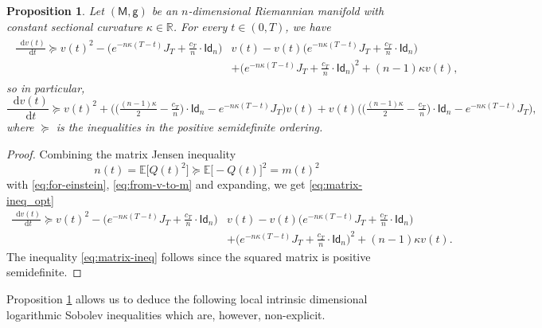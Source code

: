\documentclass[a4paper,twoside,11pt,reqno]{amsart}
\newtheorem{proposition}[theorem]{Proposition}
\newcommand*\diff{\mathop{}\!\mathrm{d}}
\newcommand{\R}{\mathbb{R}} %
\newcommand{\MM}{\mathsf{M}}
\newcommand{\GG}{\mathsf{g}}
\newcommand{\mb}{\mathbb}
\newcommand{\msf}{\mathsf}
\begin{document}
\begin{proposition} \label{prop:matrix-ineq}
Let $(\MM,\GG)$ be an $n$-dimensional Riemannian manifold with constant sectional curvature $\kappa \in\R$. For every $t\in(0,T)$, we have
\begin{align}
\label{eq:matrix-ineq_opt}
\begin{split}
\frac{\diff v(t)}{\diff t} \succeq v(t)^2- \Big( e^{-n\kappa(T-t)} J_T+\tfrac{c_T}{n}\cdot \msf{Id}_n  \Big) &v(t)  - v(t) \Big( e^{-n\kappa(T-t)} J_T+ \tfrac{c_T}{n}\cdot \msf{Id}_n  \Big)\\ 
& +  \Big( e^{-n\kappa(T-t)} J_T + \tfrac{c_T}{n}\cdot \msf{Id}_n \Big)^2 + (n-1)\kappa v(t),
\end{split}
\end{align}
so in particular,
\begin{equation}
\label{eq:matrix-ineq}
\frac{\diff v(t)}{\diff t} \succeq v(t)^2+ \Big( \big(\tfrac{(n-1)\kappa}{2}-\tfrac{c_T}{n}\big)\cdot \msf{Id}_n - e^{-n\kappa(T-t)} J_T \Big) v(t)  + v(t) \Big( \big(\tfrac{(n-1)\kappa}{2}-\tfrac{c_T}{n}\big)\cdot \msf{Id}_n - e^{-n\kappa(T-t)} J_T \Big),
\end{equation}
where $\succeq$ is the inequalities in the positive semidefinite ordering.
\end{proposition}

\begin{proof}
Combining the matrix Jensen inequality
\begin{equation}
n(t) = \mb{E}\big[ Q(t)^2 \big]\succeq  \mb{E}\big[-Q(t)\big]^2 = m(t)^2
\end{equation}
with \eqref{eq:for-einstein}, \eqref{eq:from-v-to-m} and expanding, we get \eqref{eq:matrix-ineq_opt}
\begin{equation} 
\begin{split}
\frac{\diff v(t)}{\diff t} \succeq v(t)^2- \Big( e^{-n\kappa(T-t)} J_T + \tfrac{c_T}{n} \cdot \msf{Id}_n \Big)& v(t)  - v(t) \Big( e^{-n\kappa(T-t)} J_T + \tfrac{c_T}{n}\cdot \msf{Id}_n \Big) 
\\ & +  \Big( e^{-n\kappa(T-t)} J_T + \tfrac{c_T}{n}\cdot \msf{Id}_n \Big)^2 + (n-1)\kappa v(t).
\end{split}
\end{equation}
The inequality \eqref{eq:matrix-ineq}  follows since the squared matrix is positive semidefinite. 
\end{proof}

Proposition \ref{prop:matrix-ineq} allows us to deduce the following local intrinsic dimensional logarithmic Sobolev inequalities which are, however, non-explicit.
\end{document}

